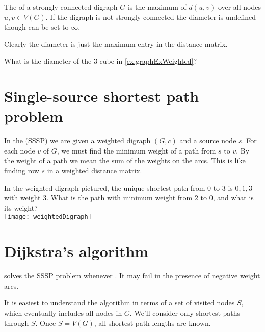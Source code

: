 \begin{Definition} \label{def:diameter}
The  of a strongly connected digraph $G$ is the
maximum of $d(u,v)$ over all nodes $u, v \in V(G)$. 
If the digraph is not strongly connected the diameter is undefined though can be set to $\infty$.

\end{Definition}

 Clearly the diameter is just the maximum entry in the distance matrix.

\begin{Boxample}[1]
What is the diameter of the 3-cube in \cref{ex:graphExWeighted}?

\end{Boxample}

\section{Single-source shortest path problem} \label{sec:SSSP}
\begin{Definition}
In  the  (SSSP) 
we are given a weighted digraph $(G, c)$ and a source node $s$. 
For each node $v$ of $G$, we must find the minimum weight of a path from $s$ to $v$.
By the weight of a path we mean the sum of the weights on the arcs. 
This is like finding row $s$ in a weighted distance matrix.
\end{Definition}

\begin{Boxample} \label{eg:SSSP}
In the weighted digraph pictured, the unique shortest path from $0$ to $3$ is $0, 1, 3$ with weight $3$.
What is the path with minimum weight from $2$ to $0$, and what is its weight?\\

\texttt{[image: weightedDigraph]}
\end{Boxample}

\section{Dijkstra's algorithm}
 solves the SSSP problem whenever . 
It may fail in the presence of negative weight arcs.

It is easiest to understand the algorithm in terms of a set of visited nodes $S$, which eventually includes all nodes in $G$. 
We'll consider only shortest paths through $S$. %
Once $S = V(G)$, all shortest path lengths are known. 

